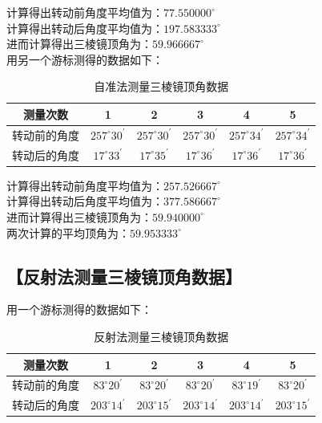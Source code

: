 \documentclass{ctexart}
\let\oldsubsection\subsection
\renewcommand{\subsection}[1]{\oldsubsection{\!\!\!\!\!\!【#1】}}
\begin{document}
计算得出转动前角度平均值为：$77.550000^\circ$ \\
计算得出转动后角度平均值为：$197.583333^\circ$ \\
进而计算得出三棱镜顶角为：$59.966667^\circ$ \\

用另一个游标测得的数据如下：

\begin{table}[H]
  \centering
  \begin{tabular}{|c|c|c|c|c|c|}
    \hline
     测量次数           & 1 & 2 & 3 & 4 & 5 \\\hline
     转动前的角度 &$257^\circ 30^\prime$&$257^\circ 30^\prime$&$257^\circ 30^\prime$&$257^\circ 34^\prime$&$257^\circ 34^\prime$\\\hline
     转动后的角度 &$17^\circ 33^\prime$&$17^\circ 35^\prime$&$17^\circ 36^\prime$&$17^\circ 36^\prime$&$17^\circ 36^\prime$\\\hline
  \end{tabular}
  \caption{自准法测量三棱镜顶角数据}
\end{table}

计算得出转动前角度平均值为：$257.526667^\circ$ \\
计算得出转动后角度平均值为：$377.586667^\circ$ \\
进而计算得出三棱镜顶角为：$59.940000^\circ$ \\
两次计算的平均顶角为：$59.953333^\circ$

\subsection{反射法测量三棱镜顶角数据}

用一个游标测得的数据如下：

\begin{table}[H]
  \centering
  \begin{tabular}{|c|c|c|c|c|c|}
    \hline
     测量次数           & 1 & 2 & 3 & 4 & 5 
     \\\hline
     转动前的角度 &$83^\circ 20^\prime$&$83^\circ 20^\prime$&$83^\circ 20^\prime$&$83^\circ 19^\prime$&$83^\circ 20^\prime$\\\hline
     转动后的角度 &$203^\circ 14^\prime$&$203^\circ 15^\prime$&$203^\circ 14^\prime$&$203^\circ 14^\prime$&$203^\circ 15^\prime$\\\hline
  \end{tabular}
  \caption{反射法测量三棱镜顶角数据}
\end{table}
\end{document}

